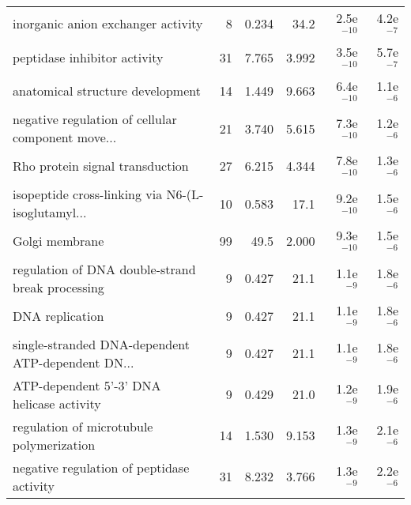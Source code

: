 \begin{longtable}{lrrrrr}
                inorganic anion exchanger activity &                       8 &                   0.234 &       34.2 &         2.5e$^{-10}$ &          4.2e$^{-7}$ \\
                      peptidase inhibitor activity &                      31 &                   7.765 &      3.992 &         3.5e$^{-10}$ &          5.7e$^{-7}$ \\
                  anatomical structure development &                      14 &                   1.449 &      9.663 &         6.4e$^{-10}$ &          1.1e$^{-6}$ \\
 negative regulation of cellular component move... &                      21 &                   3.740 &      5.615 &         7.3e$^{-10}$ &          1.2e$^{-6}$ \\
                   Rho protein signal transduction &                      27 &                   6.215 &      4.344 &         7.8e$^{-10}$ &          1.3e$^{-6}$ \\
 isopeptide cross-linking via N6-(L-isoglutamyl... &                      10 &                   0.583 &       17.1 &         9.2e$^{-10}$ &          1.5e$^{-6}$ \\
                                    Golgi membrane &                      99 &                    49.5 &      2.000 &         9.3e$^{-10}$ &          1.5e$^{-6}$ \\
  regulation of DNA double-strand break processing &                       9 &                   0.427 &       21.1 &          1.1e$^{-9}$ &          1.8e$^{-6}$ \\
                                   DNA replication &                       9 &                   0.427 &       21.1 &          1.1e$^{-9}$ &          1.8e$^{-6}$ \\
 single-stranded DNA-dependent ATP-dependent DN... &                       9 &                   0.427 &       21.1 &          1.1e$^{-9}$ &          1.8e$^{-6}$ \\
         ATP-dependent 5'-3' DNA helicase activity &                       9 &                   0.429 &       21.0 &          1.2e$^{-9}$ &          1.9e$^{-6}$ \\
          regulation of microtubule polymerization &                      14 &                   1.530 &      9.153 &          1.3e$^{-9}$ &          2.1e$^{-6}$ \\
         negative regulation of peptidase activity &                      31 &                   8.232 &      3.766 &          1.3e$^{-9}$ &          2.2e$^{-6}$ \\

\end{longtable}

